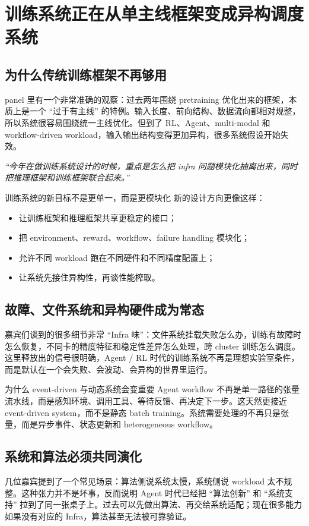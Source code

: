 \section{训练系统正在从单主线框架变成异构调度系统}

\subsection{为什么传统训练框架不再够用}
panel 里有一个非常准确的观察：过去两年围绕 pretraining 优化出来的框架，本质上是一个 ``过于有主线'' 的特例。输入长度、前向结构、数据流向都相对规整，所以系统很容易围绕统一主线优化。但到了 RL、Agent、multi-modal 和 workflow-driven workload，输入输出结构变得更加异构，很多系统假设开始失效。

\textit{``今年在做训练系统设计的时候，重点是怎么把 infra 问题模块化抽离出来，同时把推理框架和训练框架联合起来。''}

\begin{importantbox}{训练系统的新目标不是更单一，而是更模块化}
新的设计方向更像这样：
\begin{itemize}
  \item 让训练框架和推理框架共享更稳定的接口；
  \item 把 environment、reward、workflow、failure handling 模块化；
  \item 允许不同 workload 跑在不同硬件和不同精度配置上；
  \item 让系统先接住异构性，再谈性能榨取。
\end{itemize}
\end{importantbox}

\subsection{故障、文件系统和异构硬件成为常态}
嘉宾们谈到的很多细节非常 ``Infra 味''：文件系统挂载失败怎么办，训练有故障时怎么恢复，不同卡的精度特征和稳定性差异怎么处理，跨 cluster 训练怎么调度。这里释放出的信号很明确，Agent / RL 时代的训练系统不再是理想实验室条件，而是默认在一个会失败、会波动、会异构的世界里运行。

\begin{knowledgebox}{为什么 event-driven 与动态系统会变重要}
Agent workflow 不再是单一路径的张量流水线，而是感知环境、调用工具、等待反馈、再决定下一步。这天然更接近 event-driven system，而不是静态 batch training。系统需要处理的不再只是张量，而是异步事件、状态更新和 heterogeneous workflow。
\end{knowledgebox}

\subsection{系统和算法必须共同演化}
几位嘉宾提到了一个常见场景：算法侧说系统太慢，系统侧说 workload 太不规整。这种张力并不是坏事，反而说明 Agent 时代已经把 ``算法创新'' 和 ``系统支持'' 拉到了同一张桌子上。过去可以先做出算法、再交给系统适配；现在很多能力如果没有对应的 Infra，算法甚至无法被可靠验证。

